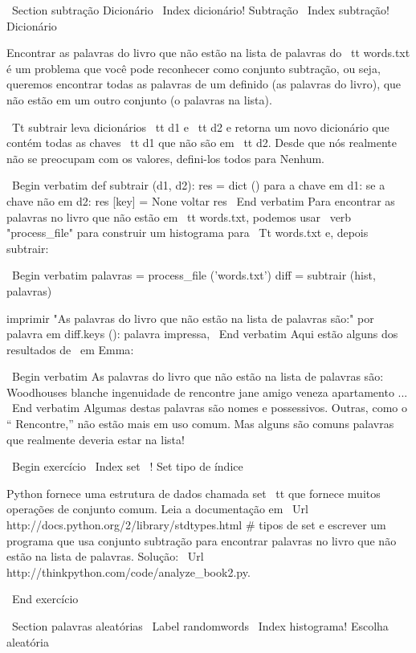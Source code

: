\documentclass[10pt]{book}
\begin{document}
{{{{{{{{{\ Section {} subtração Dicionário
\ Index {dicionário! Subtração}
\ Index {subtração! Dicionário}

Encontrar as palavras do livro que não estão na lista de palavras
do {\ tt words.txt} é um problema que você pode reconhecer como conjunto
subtração, ou seja, queremos encontrar todas as palavras de um
definido (as palavras do livro), que não estão em um outro conjunto (o
palavras na lista).

{\ Tt subtrair} leva dicionários {\ tt d1} e {\ tt d2} e retorna um
novo dicionário que contém todas as chaves {\ tt d1} que não são
em {\ tt d2}. Desde que nós realmente não se preocupam com os valores,
defini-los todos para Nenhum.

\ Begin {verbatim}
def subtrair (d1, d2):
    res = dict ()
    para a chave em d1:
        se a chave não em d2:
            res [key] = None
    voltar res
\ End {verbatim}
%
Para encontrar as palavras no livro que não estão em {\ tt words.txt},
podemos usar \ verb "process_file" para construir um histograma para
{\ Tt words.txt} e, depois subtrair:

\ Begin {verbatim}
palavras = process_file ('words.txt')
diff = subtrair (hist, palavras)

imprimir "As palavras do livro que não estão na lista de palavras são:"
por palavra em diff.keys ():
    palavra impressa,
\ End {verbatim}
%
Aqui estão alguns dos resultados de {\ em Emma}:

\ Begin {verbatim}
As palavras do livro que não estão na lista de palavras são:
 Woodhouses blanche ingenuidade de rencontre jane 
amigo veneza apartamento ...
\ End {verbatim}
%
Algumas destas palavras são nomes e possessivos. Outras, como o
`` Rencontre,'' não estão mais em uso comum. Mas alguns são comuns
palavras que realmente deveria estar na lista!

\ Begin {} exercício
\ Index {set}
\ {!} Set tipo de índice

Python fornece uma estrutura de dados chamada {set \ tt} que fornece muitos
operações de conjunto comum. Leia a documentação em
\ Url {http://docs.python.org/2/library/stdtypes.html # tipos de set} e
escrever um programa que usa conjunto subtração para encontrar palavras no livro
que não estão na lista de palavras. Solução:
\ Url {http://thinkpython.com/code/analyze_book2.py}.

\ End {} exercício


\ Section {palavras aleatórias}
\ Label {} randomwords
\ Index {histograma! Escolha aleatória}

}}}}}}}}}
\end{document}
